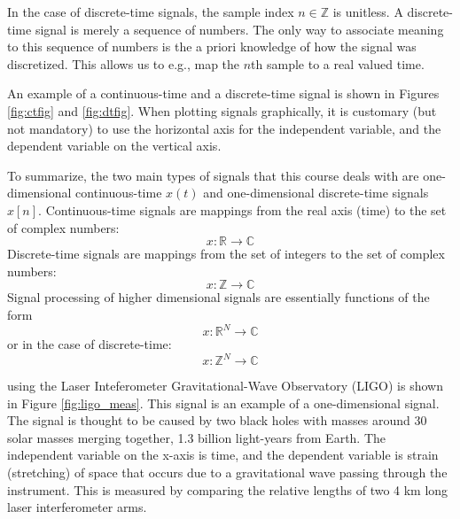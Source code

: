 In the case of discrete-time signals, the sample index
$n \in \mathbb{Z}$ is unitless. A discrete-time signal is merely a sequence of numbers. The only way to associate meaning to this sequence of numbers is the a priori knowledge of how the signal was discretized. This allows us to e.g., map the $n$th sample to a real valued time.

An example of a continuous-time and a discrete-time signal is shown in Figures \ref{fig:ctfig} and \ref{fig:dtfig}. When plotting signals graphically, it is customary (but not mandatory) to use the horizontal axis for the independent variable, and the dependent variable on the vertical axis.

To summarize, the two main types of signals that this course deals with are one-dimensional continuous-time $x(t)$ and one-dimensional discrete-time signals $x[n]$. Continuous-time signals are mappings from the real axis (time) to the set of complex numbers:
\begin{equation}
\boxed{
x: \mathbb{R} \rightarrow \mathbb{C}
}
\end{equation}
Discrete-time signals are mappings from the set of integers to the set of complex numbers:
\begin{equation}
\boxed{
x: \mathbb{Z} \rightarrow \mathbb{C}
}
\end{equation}
Signal processing of higher dimensional signals are essentially functions of the form
\begin{equation}
x: \mathbb{R}^N \rightarrow \mathbb{C}
\end{equation}
or in the case of discrete-time:
\begin{equation}
x: \mathbb{Z}^N \rightarrow \mathbb{C}
\end{equation}

 using the Laser Inteferometer Gravitational-Wave Observatory (LIGO) is shown in Figure \ref{fig:ligo_meas}. This signal is an example of a one-dimensional signal. The signal is thought to be caused by two black holes with masses around 30 solar masses merging together, 1.3 billion light-years from Earth. The independent variable on the x-axis is time, and the dependent variable is strain (stretching) of space that occurs due to a gravitational wave passing through the instrument. This is measured by comparing the relative lengths of two 4 km long laser interferometer arms. 

